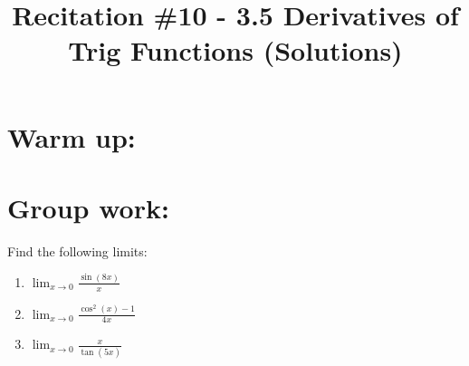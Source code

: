 \documentclass[nooutcomes]{ximera}
\title{Recitation \#10 - 3.5 Derivatives of Trig Functions (Solutions)}
\begin{document}
\begin{abstract}		\end{abstract}
\maketitle

\section*{Warm up:} 
	
	\begin{freeResponse}
	\end{freeResponse}	
	
	
	
	
	

\section*{Group work:}

\begin{problem}
Find the following limits:

	\begin{enumerate}
	
	\item  $\lim_{x \to 0} \frac{\sin(8x)}{x}$
			\begin{freeResponse}
			
			\end{freeResponse}
			
			
			
	\item  $\lim_{x \to 0} \frac{\cos^2(x) - 1}{4x}$
			\begin{freeResponse}
			
			\end{freeResponse}
			
			
			
	\item  $\lim_{x \to 0} \frac{x}{\tan(5x)}$
			\begin{freeResponse}
			
			\end{freeResponse}
			
			
			
	\end{enumerate}
\end{problem}
	
	
	
	
			
			
\end{document}

